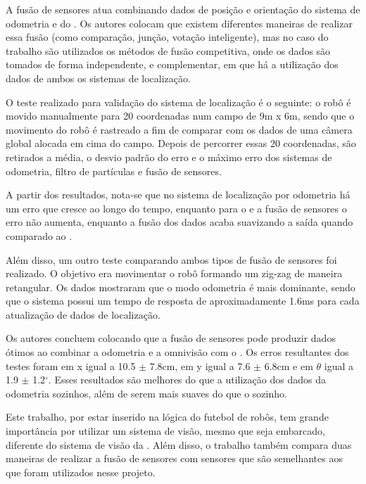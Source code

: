 \documentclass[acronym, symbols, table, deposito]{fei}
\begin{document}

A fusão de sensores atua combinando dados de posição e orientação do sistema de odometria e do . Os autores colocam que existem diferentes maneiras de realizar essa fusão (como comparação, junção, votação inteligente), mas no caso do trabalho são utilizados os métodos de fusão competitiva, onde os dados são tomados de forma independente, e complementar, em que há a utilização dos dados de ambos os sistemas de localização.

O teste realizado para validação do sistema de localização é o seguinte: o robô é movido manualmente para 20 coordenadas num campo de 9m x 6m, sendo que o movimento do robô é rastreado a fim de comparar com os dados de uma câmera global alocada em cima do campo. Depois de percorrer essas 20 coordenadas, são retirados a média, o desvio padrão do erro e o máximo erro dos sistemas de odometria, filtro de partículas e fusão de sensores.

A partir dos resultados, nota-se que no sistema de localização por odometria há um erro que cresce ao longo do tempo, enquanto para o  e a fusão de sensores o erro não aumenta, enquanto a fusão dos dados acaba suavizando a saída quando comparado ao .

Além disso, um outro teste comparando ambos tipos de fusão de sensores foi realizado. O objetivo era movimentar o robô formando um zig-zag de maneira retangular. Os dados mostraram que o modo odometria é mais dominante, sendo que o sistema possui um tempo de resposta de aproximadamente 1.6ms para cada atualização de dados de localização.

Os autores concluem colocando que a fusão de sensores pode produzir dados ótimos ao combinar a odometria e a omnivisão com o . Os erros resultantes dos testes foram em x igual a 10.5 $\pm$ 7.8cm, em y igual a 7.6 $\pm$ 6.8cm e em $\theta$ igual a 1.9 $\pm$ 1.2$^\circ$. Esses resultados são melhores do que a utilização dos dados da odometria sozinhos, além de serem mais suaves do que o  sozinho.

Este trabalho, por estar inserido na lógica do futebol de robôs, tem grande importância por utilizar um sistema de visão, mesmo que seja embarcado, diferente do sistema de visão da . Além disso, o trabalho também compara duas maneiras de realizar a fusão de sensores com sensores que são semelhantes aos que foram utilizados nesse projeto.
\end{document}
